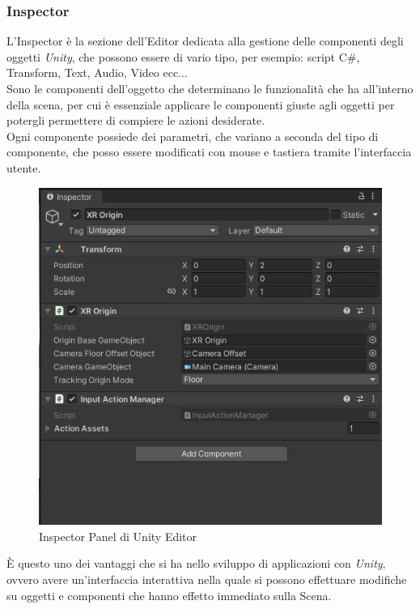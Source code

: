 \subsubsection{Inspector}
L'Inspector\cite{unityInspector} è la sezione dell'Editor dedicata alla gestione delle componenti degli oggetti \textit{Unity}, che possono essere di vario tipo, per esempio: script C\#, Transform, Text, Audio, Video ecc...
\\Sono le componenti dell'oggetto che determinano le funzionalità che ha all'interno della scena, per cui è essenziale applicare le componenti giuste agli oggetti per potergli permettere di compiere le azioni desiderate.
\\Ogni componente possiede dei parametri, che variano a seconda del tipo di componente, che posso essere modificati con mouse e tastiera tramite l'interfaccia utente.
\vspace*{0.5cm}
\begin{figure}[H]
    \centering
    \includegraphics[scale = 1]{Immagini/Inspector.jpg}
    \caption{Inspector Panel di Unity Editor}
    \label{fig:my_label}
\end{figure}
\hspace{-0.6cm}È questo uno dei vantaggi che si ha nello sviluppo di applicazioni con \textit{Unity}, ovvero avere un'interfaccia interattiva nella quale si possono effettuare modifiche su oggetti e componenti che hanno effetto immediato sulla Scena.
\vspace{-2cm}
